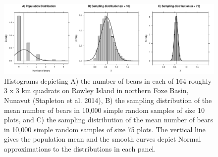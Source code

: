 \documentclass[fleqn,10pt]{wlpeerj} %
\begin{document}


\begin{figure}
\includegraphics[width=1\linewidth]{B4B_files/figure-latex/figure1-1} \caption{Histograms depicting A) the number of bears in each of 164 roughly 3 x 3 km quadrats on Rowley Island in northern Foxe Basin, Nunavut (Stapleton et al. 2014), B) the sampling distribution of the mean number of bears in 10,000 simple random samples of size 10 plots, and C) the sampling distribution of the mean number of bears in 10,000 simple random samples of size 75 plots. The vertical line gives the population mean and the smooth curves depict Normal approximations to the distributions in each panel.}\label{fig:figure1}
\end{figure}
\end{document}
